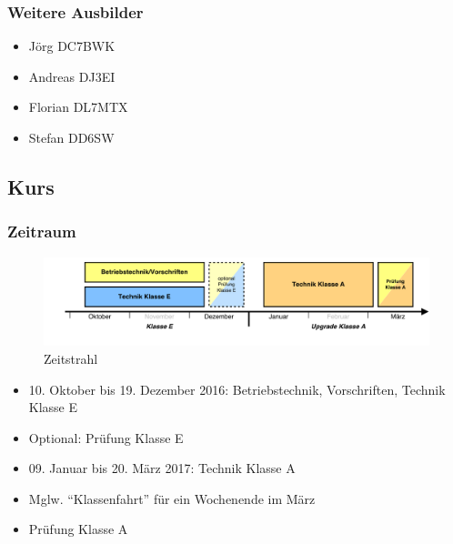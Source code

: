 \begin{frame}
  \frametitle{Weitere Ausbilder}

  \begin{itemize}
    \item Jörg DC7BWK
    \item Andreas DJ3EI
    \item Florian DL7MTX
    \item Stefan DD6SW
  \end{itemize}
\end{frame}


\subsection{Kurs}

\begin{frame}
  \frametitle{Zeitraum}

  \begin{center}
    \begin{figure}
      \includegraphics[height=.35\textheight,width=\textwidth,keepaspectratio]{o00/Zeitstrahl.pdf}
      \caption{Zeitstrahl}
    \end{figure}
  \end{center}

  \begin{itemize}
    \item 10. Oktober bis 19. Dezember 2016: Betriebstechnik, Vorschriften, Technik Klasse E
    \item Optional: Prüfung Klasse E
    \item 09. Januar bis 20. März 2017: Technik Klasse A
    \item Mglw. “Klassenfahrt” für ein Wochenende im März
    \item Prüfung Klasse A
  \end{itemize}
\end{frame}

